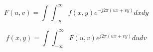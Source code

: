 \documentclass{article}
\begin{document}
\begin{equation}
F(u, v) = \int \int^{\infty}_{-\infty} f(x, y) e^{-j 2 \pi (ux+vy)} dx dy
\end{equation}

\begin{equation}
f(x, y) = \int \int^{\infty}_{-\infty} F(u, v) e^{j 2 \pi (ux+vy)} du dv
\end{equation}
\end{document}

